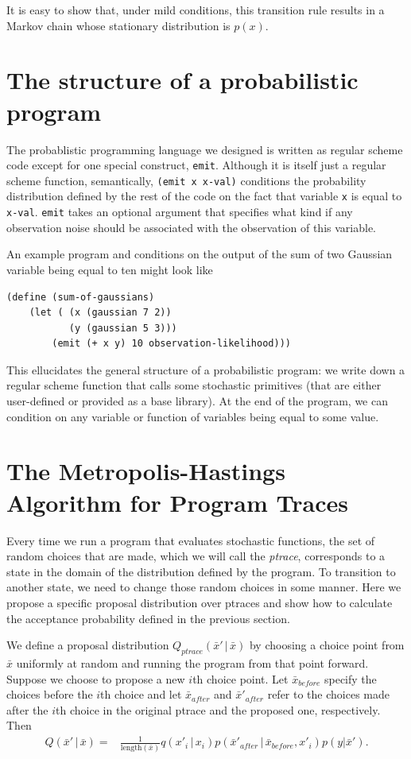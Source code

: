\documentclass{article}
\newcommand{\given}{\, |\,}
\begin{document}
It is easy to show that, under mild conditions, this transition rule results in
a Markov chain whose stationary distribution is $p(x)$.

\section{The structure of a probabilistic program}
The probablistic programming language we designed is written as regular scheme
code except for one special construct, \verb+emit+.  Although it is itself just a
regular scheme function, semantically, \verb+(emit x x-val)+ conditions the
probability distribution defined by the rest of the code on the fact that
variable \verb+x+ is equal to \verb+x-val+. \verb+emit+ takes an optional
argument that specifies what kind if any observation noise should be associated
with the observation of this variable. 

An example program and conditions on the output of the sum of two Gaussian
variable being equal to ten might look like

\begin{verbatim}
(define (sum-of-gaussians)
    (let ( (x (gaussian 7 2))
           (y (gaussian 5 3)))
        (emit (+ x y) 10 observation-likelihood)))
\end{verbatim}

This ellucidates the general structure of a probabilistic program: we write down
a regular scheme function that calls some stochastic primitives (that are either
user-defined or provided as a base library). At the end of the program, we can
condition on any variable or function of variables being equal to some value. 

\section{The Metropolis-Hastings Algorithm for Program Traces}
Every time we run a program that evaluates stochastic functions, the set of
random choices that are made, which we will call the \emph{ptrace}, corresponds
to a state in the domain of the distribution defined by the program. To
transition to another state, we need to change those random choices in some
manner. Here we propose a specific proposal distribution over ptraces and show
how to calculate the acceptance probability defined in the previous section. 

We define a proposal distribution $Q_{ptrace}(\bar{x}'\given \bar{x} )$ by
choosing a choice point from $\bar{x}$ uniformly at random and running the program
from that point forward. Suppose we choose to propose a new $i$th choice point.
Let $\bar{x}_{before}$ specify the choices before the $i$th choice and let
$\bar{x}_{after}$ and $\bar{x}'_{after}$ refer to the choices made after the
$i$th choice in the original ptrace and the proposed one, respectively. Then
\begin{align}
Q(\bar{x}' \given \bar{x}) =& \frac{1}{\text{length}(\bar{x})} 
                            q(x'_i \given x_i) p(\bar{x}'_{after} \given
                            \bar{x}_{before}, x'_i)
                            p(y | \bar{x}').
\end{align}
\end{document}

